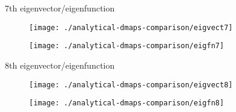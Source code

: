\documentclass[11pt]{article}
\begin{document}
\clearpage

7th eigenvector/eigenfunction

\begin{figure}[htbp]
  \centering
  \texttt{[image: ./analytical-dmaps-comparison/eigvect7]}
\end{figure}

\begin{figure}[htbp]
  \centering
  \texttt{[image: ./analytical-dmaps-comparison/eigfn7]}
\end{figure}

\clearpage

8th eigenvector/eigenfunction

\begin{figure}[htbp]
  \centering
  \texttt{[image: ./analytical-dmaps-comparison/eigvect8]}
\end{figure}

\begin{figure}[htbp]
  \centering
  \texttt{[image: ./analytical-dmaps-comparison/eigfn8]}
\end{figure}

% 
% 
\end{document}
